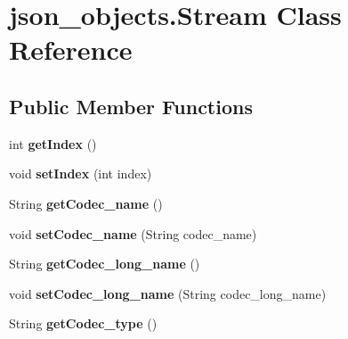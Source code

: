 \hypertarget{classjson__objects_1_1_stream}{
\section{json\_\-objects.Stream Class Reference}
\label{classjson__objects_1_1_stream}
}
\subsection*{Public Member Functions}
\begin{DoxyCompactItemize}
\item 
\hypertarget{classjson__objects_1_1_stream_a311309cd30119d85bde01a835d33424c}{
int {\bfseries getIndex} ()}
\label{classjson__objects_1_1_stream_a311309cd30119d85bde01a835d33424c}

\item 
\hypertarget{classjson__objects_1_1_stream_ab74f0d640bbf8c7ad7f9b8cdb1c81b47}{
void {\bfseries setIndex} (int index)}
\label{classjson__objects_1_1_stream_ab74f0d640bbf8c7ad7f9b8cdb1c81b47}

\item 
\hypertarget{classjson__objects_1_1_stream_af5839865caeab64741a7a4c09856d7f8}{
String {\bfseries getCodec\_\-name} ()}
\label{classjson__objects_1_1_stream_af5839865caeab64741a7a4c09856d7f8}

\item 
\hypertarget{classjson__objects_1_1_stream_a078b70ba7491f0407c47aaa407257649}{
void {\bfseries setCodec\_\-name} (String codec\_\-name)}
\label{classjson__objects_1_1_stream_a078b70ba7491f0407c47aaa407257649}

\item 
\hypertarget{classjson__objects_1_1_stream_a19a584306ca811c1e3d921b9608994d3}{
String {\bfseries getCodec\_\-long\_\-name} ()}
\label{classjson__objects_1_1_stream_a19a584306ca811c1e3d921b9608994d3}

\item 
\hypertarget{classjson__objects_1_1_stream_af8087c8e1d91be11f739f64099581d38}{
void {\bfseries setCodec\_\-long\_\-name} (String codec\_\-long\_\-name)}
\label{classjson__objects_1_1_stream_af8087c8e1d91be11f739f64099581d38}

\item 
\hypertarget{classjson__objects_1_1_stream_a8b6adbf7a9e278ace32907e87d15a0b6}{
String {\bfseries getCodec\_\-type} ()}
\label{classjson__objects_1_1_stream_a8b6adbf7a9e278ace32907e87d15a0b6}


\end{DoxyCompactItemize}
